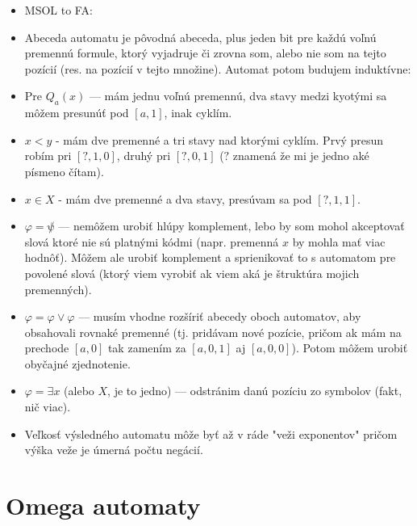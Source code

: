 \documentclass[paper=a4, fontsize=11pt]{scrartcl} %
\numberwithin{equation}{section} %
\numberwithin{figure}{section} %
\numberwithin{table}{section} %
\begin{document}
\begin{itemize}
\begin{itemize}
			\item MSOL to FA:
			\item Abeceda automatu je pôvodná abeceda, plus jeden bit pre každú voľnú premennú formule, ktorý vyjadruje či zrovna som, alebo nie som na tejto pozícií (res. na pozícií v tejto množine). Automat potom budujem induktívne:
			\item Pre $Q_a(x)$ — mám jednu voľnú premennú, dva stavy medzi kyotými sa môžem presunúť pod $[a, 1]$, inak cyklím.
			\item $x < y$ - mám dve premenné a tri stavy nad ktorými cyklím. Prvý presun robím pri $[?, 1, 0]$, druhý pri $[?, 0, 1]$ ($?$ znamená že mi je jedno aké písmeno čítam).
			\item $x \in X$ - mám dve premenné a dva stavy, presúvam sa pod $[?, 1, 1]$.
			\item $\varphi = \not \psi$ — nemôžem urobiť hlúpy komplement, lebo by som mohol akceptovať slová ktoré nie sú platnými kódmi (napr. premenná $x$ by mohla mať viac hodnôť). Môžem ale urobiť komplement a sprienikovať to s automatom pre povolené slová (ktorý viem vyrobiť ak viem aká je štruktúra mojich premenných).
			\item $\varphi = \varphi \lor \varphi$ — musím vhodne rozšíriť abecedy oboch automatov, aby obsahovali rovnaké premenné (tj. pridávam nové pozície, pričom ak mám na prechode $[a, 0]$ tak zamením za $[a, 0, 1]$ aj $[a, 0, 0]$). Potom môžem urobiť obyčajné zjednotenie.
			\item $\varphi = \exists x$ (alebo $X$, je to jedno) — odstránim danú pozíciu zo symbolov (fakt, nič viac).
			\item Veľkosť výsledného automatu môže byť až v ráde "veži exponentov" pričom výška veže je úmerná počtu negácií.
		\end{itemize}
	
	\end{itemize}

	\section{Omega automaty}
	
\end{document}
